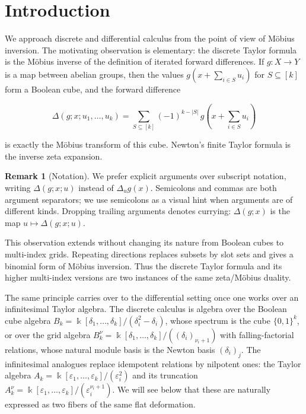 \documentclass[10pt,a4paper]{article}
\theoremstyle{plain}
\theoremstyle{definition}
\newtheorem{remark}[theorem]{Remark}
\newcommand{\ik}{\Bbbk} %
\newcommand{\1}{\mathbb{1}} %
\newcommand{\set}[1]{\{#1\}} %
\newcommand{\eps}{\varepsilon} %
\begin{document}
\tableofcontents

\section{Introduction}\label{introduction}

We approach discrete and differential calculus from the point of view of
Möbius inversion. The motivating observation is elementary: the discrete
Taylor formula is the Möbius inverse of the definition of iterated
forward differences. If \(g: X \to Y\) is a map between abelian groups,
then the values \(g(x + \sum_{i \in S} u_i)\) for \(S \subseteq [k]\)
form a Boolean cube, and the forward difference

\[
  \Delta(g; x; u_1, \dots, u_k) = \sum_{S \subseteq [k]} (-1)^{k-|S|}\, g(x + {\textstyle\sum_{i \in S}} u_i)
\]

is exactly the Möbius transform of this cube. Newton's finite Taylor
formula is the inverse zeta expansion.

\begin{remark}[Notation]

We prefer explicit arguments over subscript notation, writing
\(\Delta(g; x; u)\) instead of \(\Delta_u g(x)\). Semicolons and commas
are both argument separators; we use semicolons as a visual hint when
arguments are of different kinds. Dropping trailing arguments denotes
currying: \(\Delta(g; x)\) is the map \(u \mapsto \Delta(g; x; u)\).

\end{remark}

This observation extends without changing its nature from Boolean cubes
to multi-index grids. Repeating directions replaces subsets by slot sets
and gives a binomial form of Möbius inversion. Thus the discrete Taylor
formula and its higher multi-index versions are two instances of the
same zeta/Möbius duality.

The same principle carries over to the differential setting once one
works over an infinitesimal Taylor algebra. The discrete calculus is
algebra over the Boolean cube algebra
\(B_k = \ik[\delta_1, \dots, \delta_k]/(\delta_i^2 - \delta_i)\), whose
spectrum is the cube \(\set{0,1}^k\), or over the grid algebra
\(B_k^\nu = \ik[\delta_1, \dots, \delta_k]/((\delta_i)_{\nu_i+1})\) with
falling-factorial relations, whose natural module basis is the Newton
basis \((\delta_i)_j\). The infinitesimal analogues replace idempotent
relations by nilpotent ones: the Taylor algebra
\(A_k = \ik[\eps_1, \dots, \eps_k]/(\eps_i^2)\) and its truncation
\(A_k^\nu = \ik[\eps_1, \dots, \eps_k]/(\eps_i^{\nu_i+1})\). We will see
below that these are naturally expressed as two fibers of the same flat
deformation.
\end{document}
